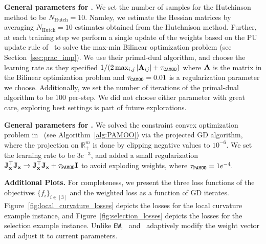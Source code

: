 \textbf{General parameters for \CAMOO.}
We set the number of samples for the Hutchinson method to be $N_{\mathrm{Hutch}}=10$. Namley, we estimate the Hessian matrices by averaging $N_{\mathrm{Hutch}}=10$ estimates obtained from the Hutchnison method.  Further, at each training step we perform a single update of the weights based on the PU update rule of~\citet{cen2021fast} to solve the max-min Bilinear optimization problem (see Section~\ref{sec:prac_imp}). We use their primal-dual algorithm, and choose the learning rate as they specified $1 / (2 \max_{i,j}|{\mathbf{A}}_{ij}| + \tau_{\texttt{CAMOO}})$ where ${\mathbf{A}}$ is the matrix in the Bilinear optimization problem and $\tau_{\texttt{CAMOO}}=0.01$ is a regularization parameter we choose. Additionally, we set the number of iterations of the primal-dual algorithm to be $100$ per-step. We did not choose either parameter with great care, exploring best settings is part of future explorations.
%

\textbf{General parameters for \PAMOO.} We solved the constraint convex optimization problem in \PAMOO\ (see Algorithm~\ref{alg:PAMOO}) via the projected GD algorithm, where the projection on $\mathbb{R}^m_+$ is done by clipping negative values to $10^{-6}$. We set the learning rate to be $3e^{-3}$, and added a small regularization ${\mathbf{J}}_{\mathbf{x}}^\top{\mathbf{J}}_{\mathbf{x}} \rightarrow {\mathbf{J}}_{\mathbf{x}}^\top{\mathbf{J}}_{\mathbf{x}} + \tau_{\texttt{PAMOO}} {\mathbf{I}}$ to avoid exploding weights, where $\tau_{\texttt{PAMOO}}=1e^{-4}.$ 


\textbf{Additional Plots.}
For completeness, we present the three loss functions of the objectives $\{ f_i \}_{i\in [3]}$ and the weighted loss as a function of GD iterates. Figure~\ref{fig:local_curvature_losses} depicts the losses for the local curvature example instance, and Figure~\ref{fig:selection_losses} depicts the losses for the selection example instance. Unlike \texttt{EW}, \CAMOO\ and \PAMOO\ adaptively modify the weight vector and adjust it to current parameters. 


